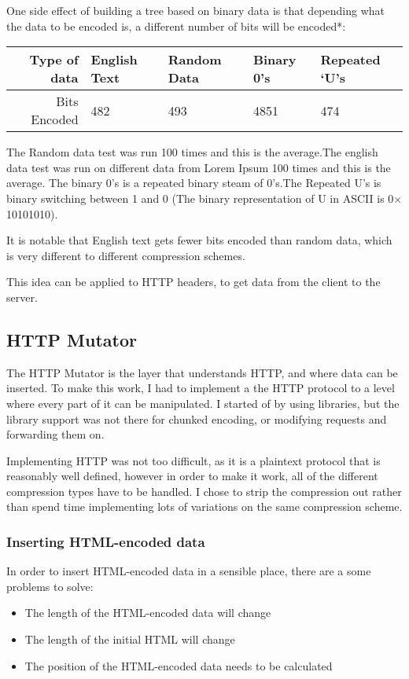 \newpage
One side effect of building a tree based on binary data is that depending what the data to be encoded is, a different number of bits will be encoded*:

\begin{table}[ht]
\begin{tabular}{@{}rllll@{}}
\toprule
Type of data & English Text & Random Data & Binary 0's & Repeated `U's \\ \midrule
Bits Encoded & 482 & 493 & 4851 & 474 \\ \bottomrule
\end{tabular}
\end{table}
{\tiny * The Random data test was run 100 times and this is the average.The english data test was run on different data from Lorem Ipsum 100 times and this is the average. The binary 0's is a repeated binary steam of 0's.The Repeated U's is binary switching between 1 and 0 (The binary representation of U in ASCII is 0$\times$10101010).}\par
\vspace{0.5cm}
It is notable that English text gets fewer bits encoded than random data, which is very different to different compression schemes.\par
\vspace{0.5cm}
This idea can be applied to HTTP headers, to get data from the client to the server.

\subsection{HTTP Mutator}
The HTTP Mutator is the layer that understands HTTP, and where data can be inserted.
To make this work, I had to implement a the HTTP protocol to a level where every part of it can be manipulated. I started of by using libraries, but the library support was not there for chunked encoding, or modifying requests and forwarding them on.\par
Implementing HTTP was not too difficult, as it is a plaintext protocol that is reasonably well defined, however in order to make it work, all of the different compression types have to be handled. I chose to strip the compression out rather than spend time implementing lots of variations on the same compression scheme.\par

\subsubsection{Inserting HTML-encoded data}
In order to insert HTML-encoded data in a sensible place, there are a some problems to solve:
\begin{itemize}
    \item The length of the HTML-encoded data will change
    \item The length of the initial HTML will change
    \item The position of the HTML-encoded data needs to be calculated
\end{itemize}

